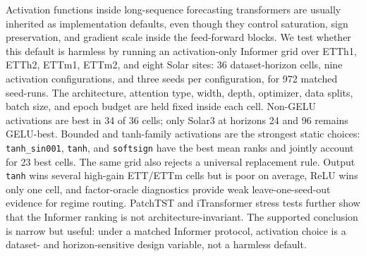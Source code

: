 Activation functions inside long-sequence forecasting transformers are usually inherited as implementation defaults, even though they control saturation, sign preservation, and gradient scale inside the feed-forward blocks. We test whether this default is harmless by running an activation-only Informer grid over ETTh1, ETTh2, ETTm1, ETTm2, and eight Solar sites: 36 dataset-horizon cells, nine activation configurations, and three seeds per configuration, for 972 matched seed-runs. The architecture, attention type, width, depth, optimizer, data splits, batch size, and epoch budget are held fixed inside each cell. Non-GELU activations are best in 34 of 36 cells; only Solar3 at horizons 24 and 96 remains GELU-best. Bounded and tanh-family activations are the strongest static choices: \texttt{tanh\_sin001}, \texttt{tanh}, and \texttt{softsign} have the best mean ranks and jointly account for 23 best cells. The same grid also rejects a universal replacement rule. Output \texttt{tanh} wins several high-gain ETT/ETTm cells but is poor on average, ReLU wins only one cell, and factor-oracle diagnostics provide weak leave-one-seed-out evidence for regime routing. PatchTST and iTransformer stress tests further show that the Informer ranking is not architecture-invariant. The supported conclusion is narrow but useful: under a matched Informer protocol, activation choice is a dataset- and horizon-sensitive design variable, not a harmless default.
